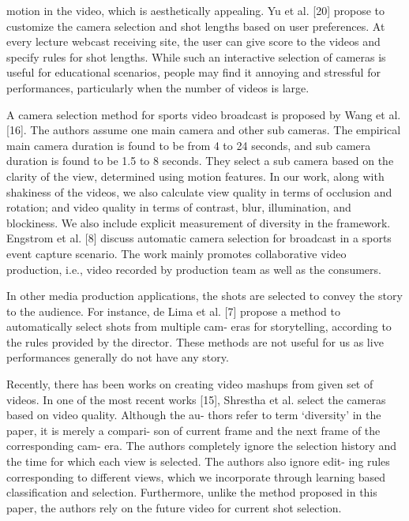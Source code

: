 \documentclass{sig-alternate-05-2015}
\begin{document}
motion in the video, which is aesthetically appealing. Yu et
al. [20] propose to customize the camera selection and shot lengths
based on user preferences. At every lecture webcast receiving site,
the user can give score to the videos and specify rules for shot
lengths. While such an interactive selection of cameras is useful
for educational scenarios, people may find it annoying and stressful
for performances, particularly when the number of videos is
large.\par
A camera selection method for sports video broadcast is proposed
by Wang et al. [16]. The authors assume one main camera
and other sub cameras. The empirical main camera duration is
found to be from 4 to 24 seconds, and sub camera duration is found
to be 1.5 to 8 seconds. They select a sub camera based on the clarity
of the view, determined using motion features. In our work,
along with shakiness of the videos, we also calculate view quality
in terms of occlusion and rotation; and video quality in terms
of contrast, blur, illumination, and blockiness. We also include
explicit measurement of diversity in the framework. Engstrom et
al. [8] discuss automatic camera selection for broadcast in a sports
event capture scenario. The work mainly promotes collaborative
video production, i.e., video recorded by production team as well
as the consumers.\par
In other media production applications, the shots are selected to
convey the story to the audience. For instance, de Lima et al. [7]
propose a method to automatically select shots from multiple cam-
eras for storytelling, according to the rules provided by the director.
These methods are not useful for us as live performances generally
do not have any story.\par
Recently, there has been works on creating video mashups from
given set of videos. In one of the most recent works [15], Shrestha
et al. select the cameras based on video quality. Although the au-
thors refer to term ‘diversity’ in the paper, it is merely a compari-
son of current frame and the next frame of the corresponding cam-
era. The authors completely ignore the selection history and the
time for which each view is selected. The authors also ignore edit-
ing rules corresponding to different views, which we incorporate
through learning based classification and selection. Furthermore,
unlike the method proposed in this paper, the authors rely on the
future video for current shot selection. 
\end{document}
